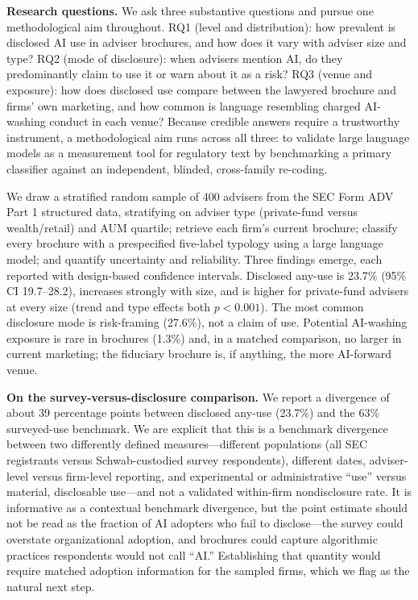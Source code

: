 \documentclass[utf8]{FrontiersinHarvard} %
\begin{document}
\textbf{Research questions.} We ask three substantive questions and pursue one methodological aim throughout. RQ1 (level and distribution): how prevalent is disclosed AI use in adviser brochures, and how does it vary with adviser size and type? RQ2 (mode of disclosure): when advisers mention AI, do they predominantly claim to use it or warn about it as a risk? RQ3 (venue and exposure): how does disclosed use compare between the lawyered brochure and firms' own marketing, and how common is language resembling charged AI-washing conduct in each venue? Because credible answers require a trustworthy instrument, a methodological aim runs across all three: to validate large language models as a measurement tool for regulatory text by benchmarking a primary classifier against an independent, blinded, cross-family re-coding.

We draw a stratified random sample of 400 advisers from the SEC Form ADV Part 1 structured data, stratifying on adviser type (private-fund versus wealth/retail) and AUM quartile; retrieve each firm's current brochure; classify every brochure with a prespecified five-label typology using a large language model; and quantify uncertainty and reliability. Three findings emerge, each reported with design-based confidence intervals. Disclosed any-use is 23.7\% (95\% CI 19.7--28.2), increases strongly with size, and is higher for private-fund advisers at every size (trend and type effects both $p < 0.001$). The most common disclosure mode is risk-framing (27.6\%), not a claim of use. Potential AI-washing exposure is rare in brochures (1.3\%) and, in a matched comparison, no larger in current marketing; the fiduciary brochure is, if anything, the more AI-forward venue.

\textbf{On the survey-versus-disclosure comparison.} We report a divergence of about 39 percentage points between disclosed any-use (23.7\%) and the 63\% surveyed-use benchmark. We are explicit that this is a benchmark divergence between two differently defined measures---different populations (all SEC registrants versus Schwab-custodied survey respondents), different dates, adviser-level versus firm-level reporting, and experimental or administrative ``use'' versus material, disclosable use---and not a validated within-firm nondisclosure rate. It is informative as a contextual benchmark divergence, but the point estimate should not be read as the fraction of AI adopters who fail to disclose---the survey could overstate organizational adoption, and brochures could capture algorithmic practices respondents would not call ``AI.'' Establishing that quantity would require matched adoption information for the sampled firms, which we flag as the natural next step.
\end{document}
